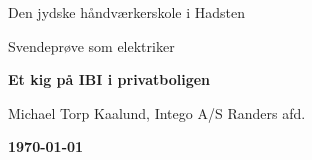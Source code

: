 \begin{titlepage}
    \centering
    {\LARGE Den jydske håndværkerskole i Hadsten \par}
    \vspace{1cm}
    {\Large Svendeprøve som elektriker \par}
    \vspace{1.5cm}
    {\huge\bfseries Et kig på IBI i privatboligen \par}
    \vspace{2cm}
    { Michael Torp Kaalund, Intego A/S Randers afd. \par}
    \vfill
    {\bfseries \today\par}
\end{titlepage}
